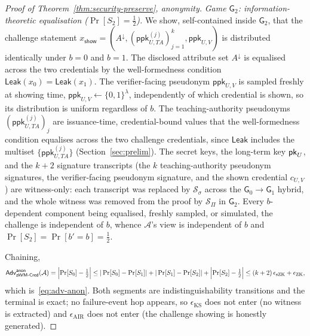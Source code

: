 \begin{proof}[Proof of Theorem~\ref{thm:security-preserve}, anonymity]
    \smallskip\noindent\emph{Game $\mathsf G_2$: information-theoretic
equalisation ($\Pr[S_2]=\tfrac12$).} We show, self-contained inside $\mathsf G_2$, that the challenge statement $x_{\mathsf{show}}=(A^\downarrow,(\mathsf{ppk}_{U,TA}^{(j)})_{j=1}^{k}, \mathsf{ppk}_{U,V})$ is distributed identically under $b=0$ and $b=1$. The disclosed attribute set $A^\downarrow$ is equalised across the two credentials by the well-formedness condition $\mathsf{Leak}(x_0)=\mathsf{Leak}(x_1)$. The verifier-facing pseudonym $\mathsf{ppk}_{U,V}$ is sampled freshly at showing time, $\mathsf{ppk}_{U,V}\leftarrow\{0,1\}^{\lambda}$, independently of which credential is shown, so its distribution is uniform regardless of $b$. The teaching-authority pseudonyms $(\mathsf{ppk}_{U,TA}^{(j)})_{j}$ are issuance-time, credential-bound values that the well-formedness condition equalises across the two challenge credentials, since $\mathsf{Leak}$ includes the multiset $\{\mathsf{ppk}_{U,TA}^{(j)}\}$ (Section~\ref{sec:prelim}). The secret keys, the long-term key $\mathsf{pk}_U$, and the $k+2$ signature transcripts (the $k$ teaching-authority pseudonym signatures, the verifier-facing pseudonym signature, and the shown credential $c_{U,V}$) are witness-only: each transcript was replaced by $\mathcal S_\sigma$ across the $\mathsf G_0\to\mathsf G_1$ hybrid, and the whole witness was removed from the proof by $\mathcal S_\Pi$ in $\mathsf G_2$. Every $b$-dependent component being equalised, freshly sampled, or simulated, the challenge is independent of $b$, whence $\mathcal A$'s view is independent of $b$ and $\Pr[S_2]=\Pr[b'=b]=\tfrac12$.

    \smallskip\noindent Chaining,
    \[
      \mathsf{Adv}^{\mathsf{anon}}_{\mathsf{zkVM\text{-}Cred}}(\mathcal A)
      =\Bigl|\Pr[S_0]-\tfrac12\Bigr|
      \le |\Pr[S_0]-\Pr[S_1]|+|\Pr[S_1]-\Pr[S_2]|+\Bigl|\Pr[S_2]-\tfrac12\Bigr|
      \le (k+2)\,\epsilon_{\mathrm{sZK}}+\epsilon_{\mathrm{ZK}},
    \]
which is~\eqref{eq:adv-anon}. Both segments are indistinguishability transitions and the terminal is exact; no failure-event hop appears, so $\epsilon_{\mathrm{KS}}$ does not enter (no witness is extracted) and $\epsilon_{\mathrm{AIR}}$ does not enter (the challenge showing is honestly generated).
\end{proof}

